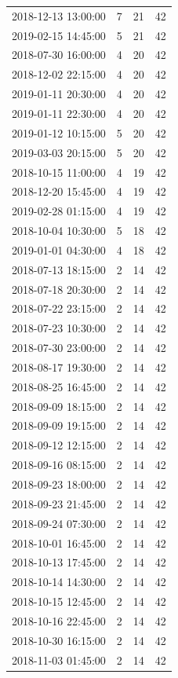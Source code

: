 \begin{tabular}{lrrr}
2018-12-13 13:00:00 & 7 & 21 & 42 \\
2019-02-15 14:45:00 & 5 & 21 & 42 \\
2018-07-30 16:00:00 & 4 & 20 & 42 \\
2018-12-02 22:15:00 & 4 & 20 & 42 \\
2019-01-11 20:30:00 & 4 & 20 & 42 \\
2019-01-11 22:30:00 & 4 & 20 & 42 \\
2019-01-12 10:15:00 & 5 & 20 & 42 \\
2019-03-03 20:15:00 & 5 & 20 & 42 \\
2018-10-15 11:00:00 & 4 & 19 & 42 \\
2018-12-20 15:45:00 & 4 & 19 & 42 \\
2019-02-28 01:15:00 & 4 & 19 & 42 \\
2018-10-04 10:30:00 & 5 & 18 & 42 \\
2019-01-01 04:30:00 & 4 & 18 & 42 \\
2018-07-13 18:15:00 & 2 & 14 & 42 \\
2018-07-18 20:30:00 & 2 & 14 & 42 \\
2018-07-22 23:15:00 & 2 & 14 & 42 \\
2018-07-23 10:30:00 & 2 & 14 & 42 \\
2018-07-30 23:00:00 & 2 & 14 & 42 \\
2018-08-17 19:30:00 & 2 & 14 & 42 \\
2018-08-25 16:45:00 & 2 & 14 & 42 \\
2018-09-09 18:15:00 & 2 & 14 & 42 \\
2018-09-09 19:15:00 & 2 & 14 & 42 \\
2018-09-12 12:15:00 & 2 & 14 & 42 \\
2018-09-16 08:15:00 & 2 & 14 & 42 \\
2018-09-23 18:00:00 & 2 & 14 & 42 \\
2018-09-23 21:45:00 & 2 & 14 & 42 \\
2018-09-24 07:30:00 & 2 & 14 & 42 \\
2018-10-01 16:45:00 & 2 & 14 & 42 \\
2018-10-13 17:45:00 & 2 & 14 & 42 \\
2018-10-14 14:30:00 & 2 & 14 & 42 \\
2018-10-15 12:45:00 & 2 & 14 & 42 \\
2018-10-16 22:45:00 & 2 & 14 & 42 \\
2018-10-30 16:15:00 & 2 & 14 & 42 \\
2018-11-03 01:45:00 & 2 & 14 & 42 \\

\end{tabular}
